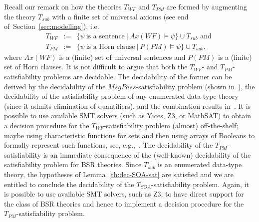 \documentclass[conference]{IEEEtran}
\newcommand{\secref}[1]{Section~\ref{#1}}
\begin{document}
\begin{LONG}
Recall our remark on how the theories $T_\mathit{WF}$ and
$T_\mathit{PM}$ are formed by augmenting the theory $T_\mathit{sub}$ with a finite
set of universal axioms (see end of~\secref{sec:modelling}), i.e.\
\begin{eqnarray*}
    T_\mathit{WF} & := & \{ \psi ~\mbox{is a sentence} ~|~ 
                   Ax(WF)\models \psi \} \cup T_\mathit{sub}  \mbox{ and }\\
   T_\mathit{PM} & := & \{ \psi ~\mbox{is a Horn clause} ~|~ 
                   P(PM)\models \psi \} \cup T_\mathit{sub} ,
\end{eqnarray*}
where $Ax(WF)$ is a (finite) set of universal sentences and $P(PM)$ is
a (finite) set of Horn clauses.  It is not difficult to argue that
both the $T_\mathit{WF}$- and $T_\mathit{PM}$-satisfiability problems are decidable.
The decidability of the former can be derived by the decidability of
the $\mathit{MsgPass}$-satisfiability problem (shown in~\cite{ic03}), the
decidability of the satisfiability problem of any enumerated data-type
theory (since it admits elimination of quantifiers), and the
combination results in~\cite{cade08}.  It is possible to use available
SMT solvers (such as Yices, Z3, or MathSAT) to obtain a decision
procedure for the $T_\mathit{WF}$-satisfiability problem (almost)
off-the-shelf; maybe using characteristic functions for sets and then
using arrays of Booleans to formally represent such functions, see,
e.g.,~\cite{bradley-manna}.  The decidability of the
$T_\mathit{PM}$-satisfiability is an immediate consequence of the
(well-known) decidability of the satisfiability problem for BSR
theories.  Since $T_\mathit{sub}$ is an enumerated data-type theory, the
hypotheses of Lemma~\ref{th:dec-SOA-sat} are satisfied and we are
entitled to conclude the decidability of the $T_\mathit{SOA}$-satisfiability
problem.  Again, it is possible to use available SMT solvers, such as
Z3, to have direct support for the class of BSR theories and hence to
implement a decision procedure for the $T_\mathit{PM}$-satisfiability
problem.


\end{LONG}
\end{document}
